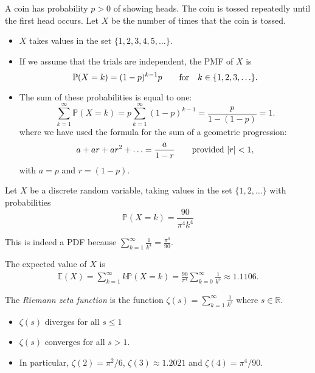 \documentclass[lecture]{csm}
\newcommand{\prob}{\mathbb{P}}
\newcommand{\expe}{\mathbb{E}}
\def\it{\item}
\def\bit{\begin{itemize}}
\def\eit{\end{itemize}}
\begin{document}
\begin{example}
A coin has probability $p > 0$ of showing heads. The coin is tossed repeatedly until the first head occurs. Let $X$ be the number of times that the coin is tossed.
\bit
\it $X$ takes values in the set $\{1,2,3,4,5,\ldots\}$.
\it If we assume that the trials are independent, the PMF of $X$ is
\[
\prob(X=k) = (1-p)^{k-1}p\text{\qquad for\quad} k\in\{1,2,3,\ldots\}.
\]
\it The sum of these probabilities is equal to one:
\[
\sum_{k=1}^{\infty} \prob(X=k) = p\sum_{k=1}^{\infty} (1-p)^{k-1}  = \frac{p}{1-(1-p)} = 1.
\]
where we have used the formula for the sum of a geometric progression:%
\[
a + ar + ar^2 + \ldots = \frac{a}{1-r} \text{\qquad provided $|r|<1$},
\]
with $a = p$ and $r = (1-p)$.

\eit

\end{example}

\newpage

\begin{example}
Let $X$ be a discrete random variable, taking values in the set $\{1,2,\ldots\}$ with probabilities
\[
\prob(X=k) = \frac{90}{\pi^4 k^4}
\]

This is indeed a PDF because 
$\displaystyle\sum_{k=1}^{\infty} \frac{1}{k^4} = \frac{\pi^4}{90}$.


The expected value of $X$ is
\begin{align*}
\expe(X) 
	= \sum_{k=1}^{\infty} k \prob(X=k)
	= \frac{90}{\pi^4}\sum_{k=0}^{\infty}\frac{1}{k^3} 
	\approx 1.1106.
\end{align*}

\end{example}
\begin{remark}
The \emph{Riemann zeta function} is the function
$
\zeta(s) = \displaystyle\sum_{k=1}^{\infty}\frac{1}{k^s}
$
where $s\in\mathbb{R}$.
\bit
\it $\zeta(s)$ diverges for all $s\leq 1$
\it $\zeta(s)$ converges for all $s > 1$. 
\it In particular, $\zeta(2)=\pi^2/6$, $\zeta(3)\approx 1.2021$ and $\zeta(4)=\pi^4/90$.
\eit
\end{remark}
\newpage
\end{document}
